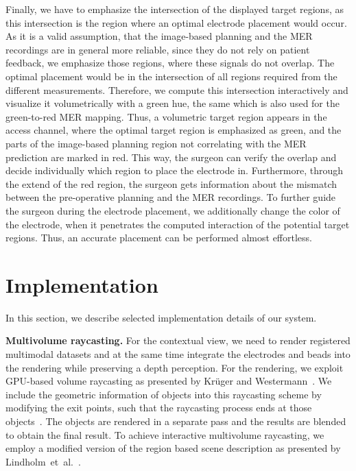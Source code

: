 \documentclass{vgtc}                          %
\begin{document}
Finally, we have to emphasize the intersection of the displayed target regions, as this intersection is the region where an optimal electrode placement would occur. As it is a valid assumption, that the image-based planning and the MER recordings are in general more reliable, since they do not rely on patient feedback, we emphasize those regions, where these signals do not overlap. The optimal placement would be in the intersection of all regions required from the different measurements. Therefore, we compute this intersection interactively and visualize it volumetrically with a green hue, the same which is also used for the green-to-red MER mapping. Thus, a volumetric target region appears in the access channel, where the optimal target region is emphasized as green, and the parts of the image-based planning region not correlating with the MER prediction are marked in red. This way, the surgeon can verify the overlap and decide individually which region to place the electrode in. Furthermore, through the extend of the red region, the surgeon gets information about the mismatch between the pre-operative planning and the MER recordings. To further guide the surgeon during the electrode placement, we additionally change the color of the electrode, when it penetrates the computed interaction of the potential target regions. Thus, an accurate placement can be performed almost effortless.



\section{Implementation}\label{sec:implementation}
In this section, we describe selected implementation details of our system.

\noindent \textbf{Multivolume raycasting.} For the contextual view, we need to render registered multimodal datasets and at the same time integrate the electrodes and beads into the rendering while preserving a depth perception. For the rendering, we exploit GPU-based volume raycasting as presented by Kr\"uger and Westermann~\cite{kr}. We include the geometric information of objects into this raycasting scheme by modifying the exit points, such that the raycasting process ends at those objects~\cite{Scharsach}. The objects are rendered in a separate pass and the results are blended to obtain the final result. To achieve interactive multivolume raycasting, we employ a modified version of the region based scene description as presented by Lindholm~et~al.~\cite{Lindholm2009}.
\end{document}
